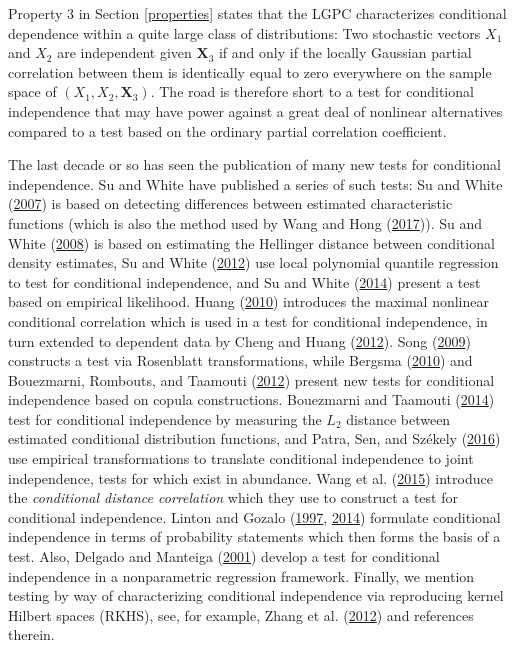 \documentclass[
  12pt,
  letterpaper]{article}
\newcommand{\X}{\bm{X}}
\theoremstyle{definition}
\theoremstyle{definition}
\theoremstyle{definition}
\theoremstyle{remark}
\begin{document}
Property 3 in Section \ref{properties} states that the LGPC characterizes conditional dependence within a quite large class of distributions: Two stochastic vectors \(X_1\) and \(X_2\) are independent given \(\X_3\) if and only if the locally Gaussian partial correlation between them is identically equal to zero everywhere on the sample space of \((X_1, X_2, \X_3)\). The road is therefore short to a test for conditional independence that may have power against a great deal of nonlinear alternatives compared to a test based on the ordinary partial correlation coefficient.

The last decade or so has seen the publication of many new tests for conditional independence. Su and White have published a series of such tests: Su and White (\protect\hyperlink{ref-su2007consistent}{2007}) is based on detecting differences between estimated characteristic functions (which is also the method used by Wang and Hong (\protect\hyperlink{ref-wang2017characteristic}{2017})). Su and White (\protect\hyperlink{ref-su2008nonparametric}{2008}) is based on estimating the Hellinger distance between conditional density estimates, Su and White (\protect\hyperlink{ref-su2012conditional}{2012}) use local polynomial quantile regression to test for conditional independence, and Su and White (\protect\hyperlink{ref-su2014testing}{2014}) present a test based on empirical likelihood. Huang (\protect\hyperlink{ref-huang2010testing}{2010}) introduces the maximal nonlinear conditional correlation which is used in a test for conditional independence, in turn extended to dependent data by Cheng and Huang (\protect\hyperlink{ref-cheng2012conditional}{2012}). Song (\protect\hyperlink{ref-song2009testing}{2009}) constructs a test via Rosenblatt transformations, while Bergsma (\protect\hyperlink{ref-bergsma2011nonparametric}{2010}) and Bouezmarni, Rombouts, and Taamouti (\protect\hyperlink{ref-bouezmarni2012nonparametric}{2012}) present new tests for conditional independence based on copula constructions. Bouezmarni and Taamouti (\protect\hyperlink{ref-boue:taam:2014}{2014}) test for conditional independence by measuring the \(L_2\) distance between estimated conditional distribution functions, and Patra, Sen, and Székely (\protect\hyperlink{ref-patra2016on}{2016}) use empirical transformations to translate conditional independence to joint independence, tests for which exist in abundance. Wang et al. (\protect\hyperlink{ref-wang2015conditional}{2015}) introduce the \emph{conditional distance correlation} which they use to construct a test for conditional independence. Linton and Gozalo (\protect\hyperlink{ref-linton1997conditional}{1997}, \protect\hyperlink{ref-linton2014testing}{2014}) formulate conditional independence in terms of probability statements which then forms the basis of a test. Also, Delgado and Manteiga (\protect\hyperlink{ref-delgado2001significance}{2001}) develop a test for conditional independence in a nonparametric regression framework. Finally, we mention testing by way of characterizing conditional independence via reproducing kernel Hilbert spaces (RKHS), see, for example, Zhang et al. (\protect\hyperlink{ref-zhang2012kernel}{2012}) and references therein.
\end{document}
